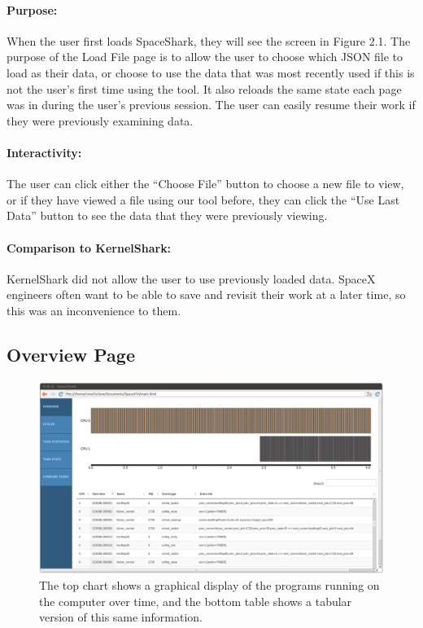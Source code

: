 \documentclass{hmcclinic}
\begin{document}
\paragraph{Purpose:}
When the user first loads SpaceShark, they will see the screen in Figure
2.1. The purpose of the Load File page is to allow the user to choose which JSON file to load as their data, 
or choose to use the data that was most recently used if this is not the user's first time using 
the tool. It also reloads the same state each page was in during
the user's previous session. The user can easily resume their work if they were previously examining data.

\paragraph{Interactivity:}
The user can click either the ``Choose File'' button to choose a new file to view, or if they have viewed a file using our tool before, they can click the ``Use Last Data'' button to see the data that they were previously viewing.

\paragraph{Comparison to KernelShark:}
KernelShark did not allow the user to use previously loaded data. SpaceX engineers often want to be able to save and revisit their work at a later time, so this was an inconvenience to them. 


  \subsection{Overview Page} 
  
  \begin{figure}[H]
  \centering
      \includegraphics[width=5in]{overview-page.png}
  \caption{The top chart shows a graphical display of the programs running on the computer over time, and the bottom table shows a tabular version of this same information.}
  \end{figure}
\end{document}
